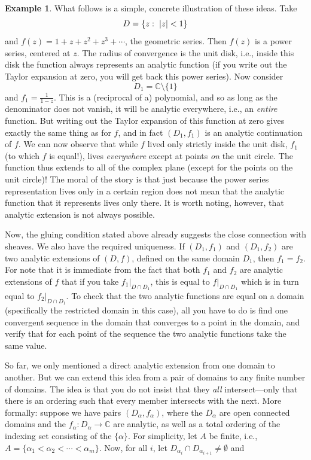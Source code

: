\documentclass[11pt]{book}
\DeclarePairedDelimiter{\abs}{\lvert}{\rvert}
\theoremstyle{definition}
\newtheorem{example}{Example}[section]
\theoremstyle{definition}
\theoremstyle{definition}
\theoremstyle{theorem}
\theoremstyle{definition}
\begin{document}
\begin{example}
	What follows is a simple, concrete illustration of these ideas. Take 
	\begin{equation*} 
	D = \{z : \hspace*{0.3em} \abs*{z} < 1\}
	\end{equation*} 
	and $f(z) = 1 + z + z^2+ z^3 + \cdots$, the geometric series. Then $f(z)$ is a power series, centered at $z$. The radius of convergence is the unit disk, i.e., inside this disk the function always represents an analytic function (if you write out the Taylor expansion at zero, you will get back this power series). Now consider 
	\begin{equation*} 
	D_1 = \mathbb{C}\setminus \{1\} 
	\end{equation*} 
	and $f_1 = \frac{1}{1-z}$. This is a (reciprocal of a) polynomial, and so as long as the denominator does not vanish, it will be analytic everywhere, i.e., an \textit{entire} function. But writing out the Taylor expansion of this function at zero gives exactly the same thing as for $f$, and in fact $(D_1, f_1)$ is an analytic continuation of $f$. We can now observe that while $f$ lived only strictly inside the unit disk, $f_1$ (to which $f$ is equal!), lives \textit{everywhere} except at points \textit{on} the unit circle. The function thus extends to all of the complex plane (except for the points on the unit circle)! The moral of the story is that just because the power series representation lives only in a certain region does not mean that the analytic function that it represents lives only there. It is worth noting, however, that analytic extension is not always possible.\par 
	Now, the gluing condition stated above already suggests the close connection with sheaves. We also have the required uniqueness. If $(D_1, f_1)$ and $(D_1, f_2)$ are two analytic extensions of $(D, f)$, defined on the same domain $D_1$, then $f_1 = f_2$. For note that it is immediate from the fact that both $f_1$ and $f_2$ are analytic extensions of $f$ that if you take $f_1|_{D \cap D_1}$, this is equal to $f|_{D \cap D_1}$ which is in turn equal to $f_2|_{D \cap D_1}$. To check that the two analytic functions are equal on a domain (specifically the restricted domain in this case), all you have to do is find one convergent sequence in the domain that converges to a point in the domain, and verify that for each point of the sequence the two analytic functions take the same value.\par 
	So far, we only mentioned a direct analytic extension from one domain to another. But we can extend this idea from a pair of domains to any finite number of domains. The idea is that you do not insist that they \textit{all} intersect---only that there is an ordering such that every member intersects with the next. More formally: suppose we have pairs $(D_{\alpha}, f_{\alpha})$, where the $D_{\alpha}$ are open connected domains and the $f_{\alpha}: D_{\alpha} \rightarrow \mathbb{C}$ are analytic, as well as a total ordering of the indexing set consisting of the $\{\alpha\}$. For simplicity, let $A$ be finite, i.e., $A = \{\alpha_1 < \alpha_2 < \cdots < \alpha_m\}$. Now, for all $i$, let $D_{\alpha_i} \cap D_{\alpha_{i+1}} \neq \emptyset$ and 

\end{example}
\end{document}
